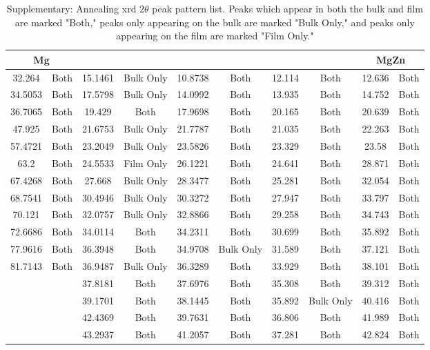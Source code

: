 \documentclass[a4paper,12pt,oneside]{article}%
\begin{document}
\begin{table}[b]
	\centering
	\caption{Supplementary: Annealing \acrshort{xrd} $2 \theta$ peak pattern list. Peaks which appear in both the bulk and film are marked "Both," peaks only appearing on the bulk are marked "Bulk Only," and peaks only appearing on the film are marked "Film Only."}
	\begin{tabular}{cccccccccc}
		\toprule
		\multicolumn{2}{c}{Mg} & \multicolumn{2}{c}{\MgZn} & \multicolumn{2}{c}{\CaMgZnFive} & \multicolumn{2}{c}{\CaMgZnThirteen} & \multicolumn{2}{c}{MgZn} \\
		\midrule
		32.264 & Both & 15.1461 & Bulk Only & 10.8738 & Both & 12.114 & Both & 12.636 & Both \\
		34.5053 & Both & 17.5798 & Bulk Only & 14.0992 & Both & 13.935 & Both & 14.752 & Both \\
		36.7065 & Both & 19.429 & Both & 17.9698 & Both & 20.165 & Both & 20.639 & Both \\
		47.925 & Both & 21.6753 & Bulk Only & 21.7787 & Both & 21.035 & Both & 22.263 & Both \\
		57.4721 & Both & 23.2049 & Bulk Only & 23.5826 & Both & 23.329 & Both & 23.58 & Both \\
		63.2 & Both & 24.5533 & Film Only & 26.1221 & Both & 24.641 & Both & 28.871 & Both \\
		67.4268 & Both & 27.668 & Bulk Only & 28.3477 & Both & 25.281 & Both & 32.054 & Both \\
		68.7541 & Both & 30.4946 & Bulk Only & 30.3272 & Both & 27.947 & Both & 33.797 & Both \\
		70.121 & Both & 32.0757 & Bulk Only & 32.8866 & Both & 29.258 & Both & 34.743 & Both \\
		72.6686 & Both & 34.0114 & Both & 34.2311 & Both & 30.699 & Both & 35.892 & Both \\
		77.9616 & Both & 36.3948 & Both & 34.9708 & Bulk Only & 31.589 & Both & 37.121 & Both \\
		81.7143 & Both & 36.9487 & Bulk Only & 36.3289 & Both & 33.929 & Both & 38.101 & Both \\
		&  & 37.8181 & Both & 37.6976 & Both & 35.308 & Both & 39.312 & Both \\
		&  & 39.1701 & Both & 38.1445 & Both & 35.892 & Bulk Only & 40.416 & Both \\
		&  & 42.4369 & Both & 39.7631 & Both & 36.806 & Both & 41.989 & Both \\
		&  & 43.2937 & Both & 41.2057 & Both & 37.281 & Both & 42.824 & Both \\

\end{tabular}
\end{table}
\end{document}
